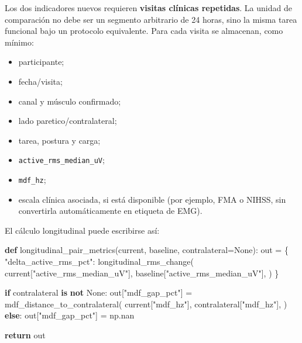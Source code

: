 \documentclass[
  spanish,
  a4paper,
  DIV=11,
  numbers=noendperiod]{scrreprt}
\newenvironment{Shaded}{\begin{snugshade}}{\end{snugshade}}
\newcommand{\ControlFlowTok}[1]{\textcolor[rgb]{0.00,0.23,0.31}{\textbf{#1}}}
\newcommand{\KeywordTok}[1]{\textcolor[rgb]{0.00,0.23,0.31}{\textbf{#1}}}
\newcommand{\NormalTok}[1]{\textcolor[rgb]{0.00,0.23,0.31}{#1}}
\newcommand{\OperatorTok}[1]{\textcolor[rgb]{0.37,0.37,0.37}{#1}}
\newcommand{\StringTok}[1]{\textcolor[rgb]{0.13,0.47,0.30}{#1}}
\newcommand{\VariableTok}[1]{\textcolor[rgb]{0.07,0.07,0.07}{#1}}
\providecommand{\tightlist}{%
  \setlength{\itemsep}{0pt}\setlength{\parskip}{0pt}}
\begin{document}
Los dos indicadores nuevos requieren \textbf{visitas clínicas
repetidas}. La unidad de comparación no debe ser un segmento arbitrario
de 24 horas, sino la misma tarea funcional bajo un protocolo
equivalente. Para cada visita se almacenan, como mínimo:

\begin{itemize}
\tightlist
\item
  participante;
\item
  fecha/visita;
\item
  canal y músculo confirmado;
\item
  lado paretico/contralateral;
\item
  tarea, postura y carga;
\item
  \texttt{active\_rms\_median\_uV};
\item
  \texttt{mdf\_hz};
\item
  escala clínica asociada, si está disponible (por ejemplo, FMA o NIHSS,
  sin convertirla automáticamente en etiqueta de EMG).
\end{itemize}

El cálculo longitudinal puede escribirse así:

\begin{Shaded}
\begin{Highlighting}[]
\KeywordTok{def}\NormalTok{ longitudinal\_pair\_metrics(current, baseline, contralateral}\OperatorTok{=}\VariableTok{None}\NormalTok{):}
\NormalTok{    out }\OperatorTok{=}\NormalTok{ \{}
        \StringTok{"delta\_active\_rms\_pct"}\NormalTok{: longitudinal\_rms\_change(}
\NormalTok{            current[}\StringTok{"active\_rms\_median\_uV"}\NormalTok{],}
\NormalTok{            baseline[}\StringTok{"active\_rms\_median\_uV"}\NormalTok{],}
\NormalTok{        )}
\NormalTok{    \}}

    \ControlFlowTok{if}\NormalTok{ contralateral }\KeywordTok{is} \KeywordTok{not} \VariableTok{None}\NormalTok{:}
\NormalTok{        out[}\StringTok{"mdf\_gap\_pct"}\NormalTok{] }\OperatorTok{=}\NormalTok{ mdf\_distance\_to\_contralateral(}
\NormalTok{            current[}\StringTok{"mdf\_hz"}\NormalTok{],}
\NormalTok{            contralateral[}\StringTok{"mdf\_hz"}\NormalTok{],}
\NormalTok{        )}
    \ControlFlowTok{else}\NormalTok{:}
\NormalTok{        out[}\StringTok{"mdf\_gap\_pct"}\NormalTok{] }\OperatorTok{=}\NormalTok{ np.nan}

    \ControlFlowTok{return}\NormalTok{ out}
\end{Highlighting}
\end{Shaded}
\end{document}
